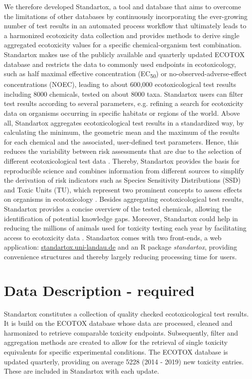 \documentclass[journal,datadescriptor,accept,moreauthors,pdftex]{Definitions/mdpi}
\begin{document}
We therefore developed Standartox, a tool and database that aims to overcome the limitations of other databases by continuously incorporating the ever-growing number of test results in an automated process workflow that ultimately leads to a harmonized ecotoxicity data collection and provides methods to derive single aggregated ecotoxicity values for a specific chemical-organism test combination. Standartox makes use of the publicly available and quarterly updated ECOTOX database \citep{usepa_ecotox_2019} and restricts the data to commonly used endpoints in ecotoxicology, such as half maximal effective concentration (EC\textsubscript{50}) or no-observed-adverse-effect concentrations (NOEC), leading to about 600,000 ecotoxicological test results including 8000 chemicals, tested on about 8000 taxa. Standartox users can filter test results according to several parameters, e.g. refining a search for ecotoxicity data on organisms occurring in specific habitats or regions of the world. Above all, Standartox aggregates ecotoxicological test results in a standardized way, by calculating the minimum, the geometric mean and the maximum of the results for each chemical and the associated, user-defined test parameters. Hence, this reduces the variability between risk assessments that are due to the selection of different ecotoxicological test data \citep{mark_analysis_1998}. Thereby, Standartox provides the basis for reproducible science and combines information from different sources to simplify the derivation of risk indicators such as Species Sensitivity Distributions (SSD) and Toxic Units (TU), which represent two prominent concepts to assess effects on organisms in ecotoxicology \citep{posthuma_species_2002, kefford_definition_2011, schafer_effects_2011}. Besides aggregating ecotoxicological test results, Standartox provides a concise overview of the tested chemicals, allowing the identification of potential knowledge gaps. Moreover, Standartox could help in reducing the millions of animals used for toxicity testing each year by facilitating access to ecotoxicity data \citep{hartung_chemical_2009}. Standartox comes with two front-ends, a web application: \url{standartox.uni-landau.de} and an R \citep{rcoreteam_language_2017} package \textit{standartox}, providing convenience structures and thereby largely reducing processing time for users.

\section{Data Description - required}
Standartox constitutes a collection of quality checked ecotoxicological test results. It is build on the ECOTOX database \citep{usepa_ecotox_2019} whose data are processed, cleaned and harmonized to retrieve comparable toxicity endpoints. Subsequently, filter and aggregation methods are created to allow for the retrieval of single toxicity equivalents for specific experimental conditions. The ECOTOX database is updated quarterly, providing on average 5228 (2014 - 2019) new toxicity entries. These are included in Standartox with each update.
\end{document}
